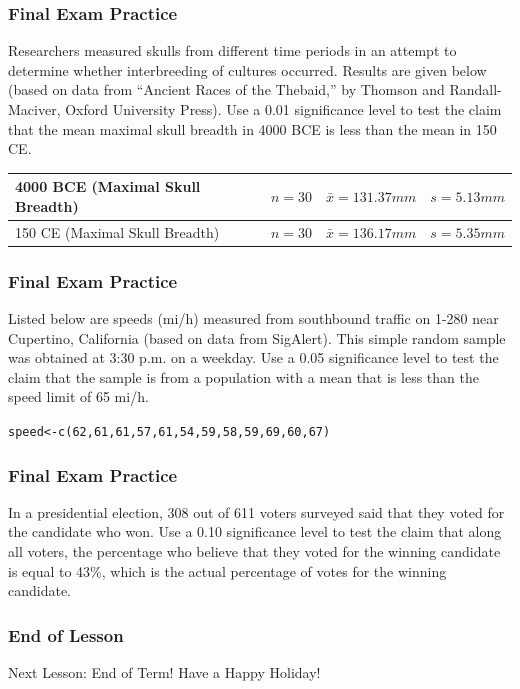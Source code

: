 \documentclass[xcolor=dvipsnames]{beamer}
\begin{document}
\begin{frame}
  \frametitle{Final Exam Practice}
  {\ubung} Researchers measured skulls from different time periods in
  an attempt to determine whether interbreeding of cultures occurred.
  Results are given below (based on data from ``Ancient Races of the
  Thebaid,'' by Thomson and Randall-Maciver, Oxford University Press).
  Use a 0.01 significance level to test the claim that the mean
  maximal skull breadth in 4000 \textsc{BCE} is less than the mean in 150 \textsc{CE}.

  \begin{tabular}{|l|c|c|c|}
    4000 \textsc{BCE} (Maximal Skull Breadth) & $n=30$ & $\bar{x}=131.37mm$ & $s=5.13mm$ \\ \hline
    150 \textsc{CE} (Maximal Skull Breadth)   & $n=30$ & $\bar{x}=136.17mm$ & $s=5.35mm$ \\ \hline
  \end{tabular}
\end{frame}

\begin{frame}[fragile]
  \frametitle{Final Exam Practice}
  {\ubung} Listed below are speeds (mi/h) measured from southbound
  traffic on 1-280 near Cupertino, California (based on data from
  SigAlert). This simple random sample was obtained at 3:30 p.m.
  on a weekday. Use a 0.05 significance level to test the claim
  that the sample is from a population with a mean that is less
  than the speed limit of 65 mi/h.

\begin{alltt}
speed<-c(62,61,61,57,61,54,59,58,59,69,60,67)
\end{alltt}
\end{frame}

\begin{frame}
  \frametitle{Final Exam Practice}
  {\ubung} In a presidential election, 308 out of 611 voters
  surveyed said that they voted for the candidate who won. Use a
  0.10 significance level to test the claim that along all voters,
  the percentage who believe that they voted for the winning
  candidate is equal to 43\%, which is the actual percentage of
  votes for the winning candidate. 
\end{frame}

\begin{frame}
  \frametitle{End of Lesson}
Next Lesson: End of Term! Have a Happy Holiday!
\end{frame}
\end{document}
